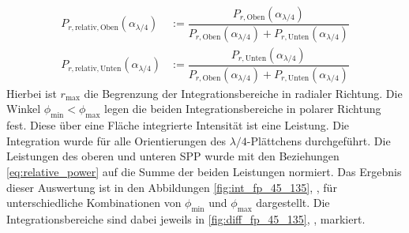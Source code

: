 \documentclass[titlepage,  ngerman]{article}
\begin{document}
		 \begin{align}
		 	\label{eq:relative_power}
		 	P_{r, \mathrm{relativ}, \mathrm{Oben}}(\alpha_{\lambda/4}) &:= 	\dfrac{P_{r, \mathrm{Oben}}(\alpha_{\lambda/4})}{P_{r, \mathrm{Oben}}(\alpha_{\lambda/4}) + P_{r, \mathrm{Unten}}(\alpha_{\lambda/4})} \\
		 	\nonumber
		 	P_{r, \mathrm{relativ}, \mathrm{Unten}}(\alpha_{\lambda/4}) &:= 	\dfrac{P_{r, \mathrm{Unten}}(\alpha_{\lambda/4})}{P_{r, \mathrm{Oben}}(\alpha_{\lambda/4}) + P_{r, \mathrm{Unten}}(\alpha_{\lambda/4})}	 	
		 \end{align}
	 	Hierbei ist $r_\mathrm{max}$ die Begrenzung der Integrationsbereiche in radialer Richtung. Die Winkel $\phi_\mathrm{min} < \phi_\mathrm{max}$ legen die beiden Integrationsbereiche in polarer
	 	 Richtung fest. Diese über eine Fläche integrierte Intensität ist eine Leistung. Die Integration wurde für alle Orientierungen des $\lambda/4$-Plättchens durchgeführt. Die Leistungen des oberen und unteren SPP wurde mit den Beziehungen \eqref{eq:relative_power} auf die Summe der beiden Leistungen normiert. Das Ergebnis dieser Auswertung ist in den Abbildungen \ref{fig:int_fp_45_135}, ,  für unterschiedliche Kombinationen von $\phi_\mathrm{min}$ und $\phi_\mathrm{max}$ dargestellt. Die Integrationsbereiche sind dabei jeweils in  \ref{fig:diff_fp_45_135}, ,  markiert.		 
\end{document}
